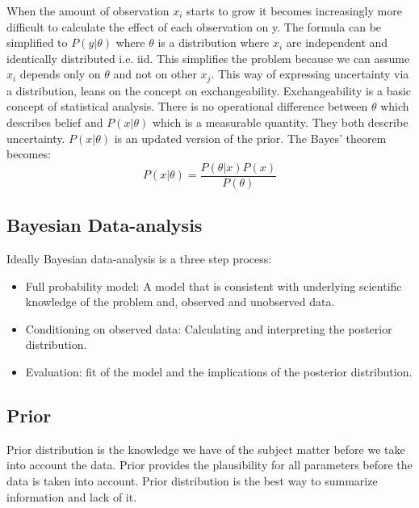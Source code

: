 When the amount of observation $x_i$ starts to grow it becomes increasingly more difficult to calculate the effect of each observation on y. The formula can be simplified to $P(y|\theta)$ where $\theta$ is a distribution where $x_i$ are independent and identically distributed i.e. iid. This simplifies the problem because we can assume $x_i$ depends only on $\theta$ and not on other $x_j$.\cite{Lindley1990The1W} This way of expressing uncertainty via a distribution, leans on the concept on exchangeability. Exchangeability is a basic concept of statistical analysis. \cite{Gel2014BayesianDA}  There is no operational difference between $\theta$ which describes belief and $P(x|\theta)$ which is a measurable quantity. They both describe uncertainty. $P(x|\theta)$ is an updated version of the prior. The Bayes' theorem becomes: 
\begin{equation}
P(x|\theta) = \frac{P(\theta|x)P(x)}{P(\theta)}
\end{equation}
\cite{Pawitan2002InAL}

\subsection{Bayesian Data-analysis}\label{BayesianDataAnalysis}
Ideally Bayesian data-analysis is a three step process: 
\begin{itemize}
    \item Full probability model: A model that is consistent with underlying scientific knowledge of the problem and, observed and unobserved data. 
    \item Conditioning on observed data: Calculating and interpreting the posterior distribution.
    \item Evaluation: fit of the model and the implications of the posterior distribution.
\end{itemize}\cite{Gel2014BayesianDA}

\subsection{Prior}\label{Prior}
Prior distribution is the knowledge we have of the subject matter before we take into account the data.\cite{Box1973BayesianII} Prior provides the plausibility for all parameters before the data is taken into account. \cite{Mcelreath2015StatisticalRA}\cite{Robert2007TheBC} Prior distribution is the best way to summarize information and lack of it.\cite{Robert2007TheBC} 


